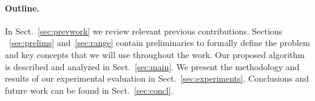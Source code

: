 %
%

\paragraph*{Outline.} %
In Sect.~\ref{sec:prevwork} we review relevant previous contributions.
Sections ~\ref{sec:prelims} and~\ref{sec:range} contain preliminaries to
formally define the problem and key concepts that we will use throughout the
work. Our proposed algorithm is described and analyzed in Sect.~\ref{sec:main}.
We present the methodology and results of our experimental evaluation %
in Sect.~\ref{sec:experiments}. Conclusions and future work can be found %
in Sect.~\ref{sec:concl}. 

